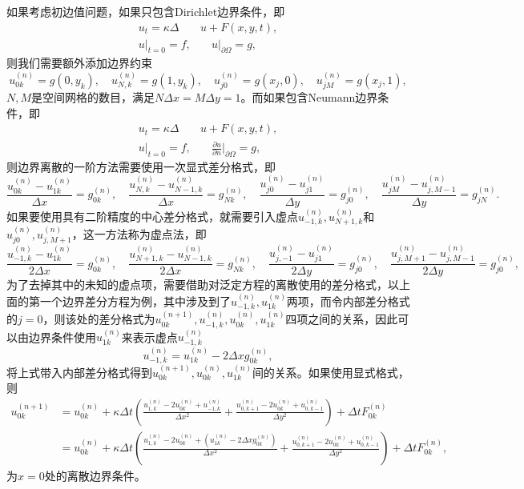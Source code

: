 \documentclass[a4paper,10pt]{ctexart}
\begin{document}
如果考虑初边值问题，如果只包含Dirichlet边界条件，即
\begin{equation}
    \begin{aligned}
        u_t = \kappa \Delta& u + F(x,y,t),\\
        u|_{t=0} = f,&\quad u|_{\partial \Omega} = g,
    \end{aligned}
\end{equation}
则我们需要额外添加边界约束
\[
    u^{(n)}_{0k} = g(0,y_k),\quad u^{(n)}_{N,k} = g(1,y_k),\quad u^{(n)}_{j0} = g(x_j,0),\quad u^{(n)}_{jM} = g(x_j,1),
\]
$ N,M $是空间网格的数目，满足$ N \Delta x = M \Delta y = 1 $。而如果包含Neumann边界条件，即
\begin{equation}
    \begin{aligned}
        u_t = \kappa \Delta& u + F(x,y,t),\\
        u|_{t=0} = f,&\quad \frac{\partial u}{\partial n}|_{\partial \Omega} = g,
    \end{aligned}
\end{equation}
则边界离散的一阶方法需要使用一次显式差分格式，即
\[
    \frac{u^{(n)}_{0k}-u^{(n)}_{1k}}{\Delta x} = g_{0k}^{(n)},\quad \frac{u^{(n)}_{N,k}-u^{(n)}_{N-1,k}}{\Delta x} = g_{Nk}^{(n)},\quad \frac{u^{(n)}_{j0}-u^{(n)}_{j1}}{\Delta y} = g_{j0}^{(n)},\quad \frac{u^{(n)}_{jM}-u^{(n)}_{j,M-1}}{\Delta y} = g_{jN}^{(n)}.
\]
如果要使用具有二阶精度的中心差分格式，就需要引入虚点$ u^{(n)}_{-1,k},u^{(n)}_{N+1,k} $和$ u^{(n)}_{j0},u^{(n)}_{j,M+1} $，这一方法称为虚点法，即
\[
    \frac{u^{(n)}_{-1,k}-u^{(n)}_{1k}}{2\Delta x} = g_{0k}^{(n)},\quad \frac{u^{(n)}_{N+1,k}-u^{(n)}_{N-1,k}}{2\Delta x} = g_{Nk}^{(n)}, \quad \frac{u^{(n)}_{j,-1}-u^{(n)}_{j1}}{2\Delta y} = g_{j0}^{(n)},\quad \frac{u^{(n)}_{j,M+1}-u^{(n)}_{j,M-1}}{2\Delta y} = g_{j0}^{(n)},
\]
为了去掉其中的未知的虚点项，需要借助对泛定方程的离散使用的差分格式，以上面的第一个边界差分方程为例，其中涉及到了$ u^{(n)}_{-1,k},u^{(n)}_{1k} $两项，而令内部差分格式的$ j=0 $，则该处的差分格式为$ u^{(n+1)}_{0k},u^{(n)}_{-1,k},u^{(n)}_{0k},u^{(n)}_{1k} $四项之间的关系，因此可以由边界条件使用$ u^{(n)}_{1k} $来表示虚点$ u^{(n)}_{-1,k} $
\[
    u^{(n)}_{-1,k} = u^{(n)}_{1k} - 2\Delta x g_{0k}^{(n)},  
\]
将上式带入内部差分格式得到$ u^{(n+1)}_{0k},u^{(n)}_{0k},u^{(n)}_{1k} $间的关系。如果使用显式格式，则
\[
    \begin{aligned}
        u^{(n+1)}_{0k} &= u^{(n)}_{0k} + \kappa \Delta t \left( \frac{u^{(n)}_{1,k}-2u^{(n)}_{0k}+u^{(n)}_{-1,k}}{\Delta x^2} + \frac{u^{(n)}_{0,k+1}-2u^{(n)}_{0k}+u^{(n)}_{0,k-1}}{\Delta y^2} \right) + \Delta t F_{0k}^{(n)}\\
        &= u^{(n)}_{0k} + \kappa \Delta t \left( \frac{u^{(n)}_{1,k}-2u^{(n)}_{0k}+(u^{(n)}_{1k} - 2\Delta x g_{0k}^{(n)})}{\Delta x^2} + \frac{u^{(n)}_{0,k+1}-2u^{(n)}_{0k}+u^{(n)}_{0,k-1}}{\Delta y^2} \right) + \Delta t F_{0k}^{(n)},
    \end{aligned}
\]
为$ x=0 $处的离散边界条件。
\end{document}
